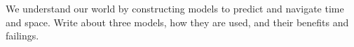 \documentclass[11pt]{article}
\begin{document}
We understand our world by constructing models to predict and navigate time and space. Write about three models, how they are used, and their benefits and failings.
\end{document}
